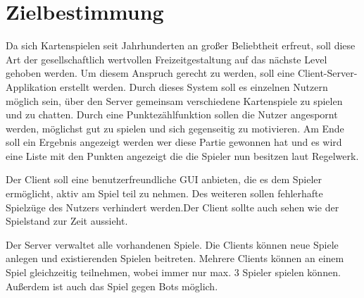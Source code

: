 \chapter{Zielbestimmung}

	Da sich Kartenspielen seit Jahrhunderten an großer Beliebtheit erfreut, soll diese Art der gesellschaftlich wertvollen Freizeitgestaltung auf das nächste Level gehoben werden. Um diesem Anspruch gerecht zu werden, soll eine Client-Server-Applikation erstellt werden. Durch dieses System soll es einzelnen Nutzern möglich sein, über den Server gemeinsam verschiedene Kartenspiele zu spielen und zu chatten. Durch eine Punktezählfunktion sollen die Nutzer angespornt werden, möglichst gut zu spielen und sich gegenseitig zu motivieren. Am Ende soll ein Ergebnis angezeigt werden wer diese Partie gewonnen hat und es wird eine Liste mit den Punkten angezeigt die die Spieler nun besitzen laut Regelwerk.

	Der Client soll eine benutzerfreundliche GUI anbieten, die es dem Spieler ermöglicht, aktiv am Spiel teil zu nehmen. Des weiteren sollen fehlerhafte Spielzüge des Nutzers verhindert werden.Der Client sollte auch sehen wie der Spielstand zur Zeit aussieht.

	Der Server verwaltet alle vorhandenen Spiele. Die Clients können neue Spiele anlegen und existierenden Spielen beitreten. Mehrere Clients können an einem Spiel gleichzeitig teilnehmen, wobei immer nur max. 3 Spieler spielen können. Außerdem ist auch das Spiel gegen Bots möglich.
